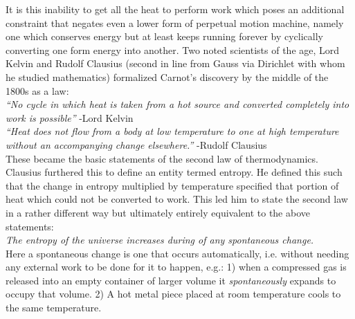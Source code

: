 \documentclass[11pt]{article} %
\numberwithin{equation}{section}
\begin{document}
It is this inability to get all the heat to perform work which poses an additional constraint that negates even a lower form of perpetual motion machine, namely one which conserves energy but at least keeps running forever by cyclically converting one form energy into another. Two noted scientists of the age, Lord Kelvin and Rudolf Clausius (second in line from Gauss via Dirichlet with whom he studied mathematics) formalized Carnot’s discovery by the middle of the 1800s as a law:\\
\textit{“No cycle in which heat is taken from a hot source and converted completely into work is possible”} -Lord Kelvin\\
\textit{“Heat does not flow from a body at low temperature to one at high temperature without an accompanying change elsewhere.”} -Rudolf Clausius\\

These became the basic statements of the second law of thermodynamics. Clausius furthered this to define an entity termed entropy. He defined this such that the change in entropy multiplied by temperature specified that portion of heat which could not be converted to work. This led him to state the second law in a rather different way but ultimately entirely equivalent to the above statements:\\
\textit{The entropy of the universe increases during of any spontaneous change.}\\
Here a spontaneous change is one that occurs automatically, i.e. without needing any external work to be done for it to happen, e.g.: 1) when a compressed gas is released into an empty container of larger volume it \textit{spontaneously} expands to occupy that volume. 2) A hot metal piece placed at room temperature cools to the same temperature.\\
\end{document}
